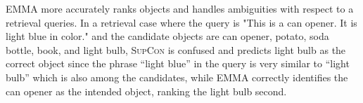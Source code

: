 \documentclass[sigconf,natbib=true,anonymous=true]{acmart}
\newcommand{\todocmi}[1]{\todo[inline,color=green!40]{\small #1 -- Cynthia}}
\newcommand{\Rephrase}[1]{{\textbf {\color{red}Rephrase please #1}}}
\newcommand{\ours}{\textsc{EMMA}}
\newcommand{\supcon}{\textsc{SupCon}}
\begin{document}
EMMA more accurately ranks objects and handles ambiguities with respect to a retrieval queries. In a retrieval case where the query is "This is a can opener. It is light blue in color." and  the candidate objects are can opener, potato, soda bottle, book, and light bulb, \supcon{} is confused and predicts light bulb as the correct object since the phrase “light blue” in the query is very similar to “light bulb” which is also among the candidates, while EMMA correctly identifies the can opener as the intended object, ranking the light bulb second.

\end{document}
